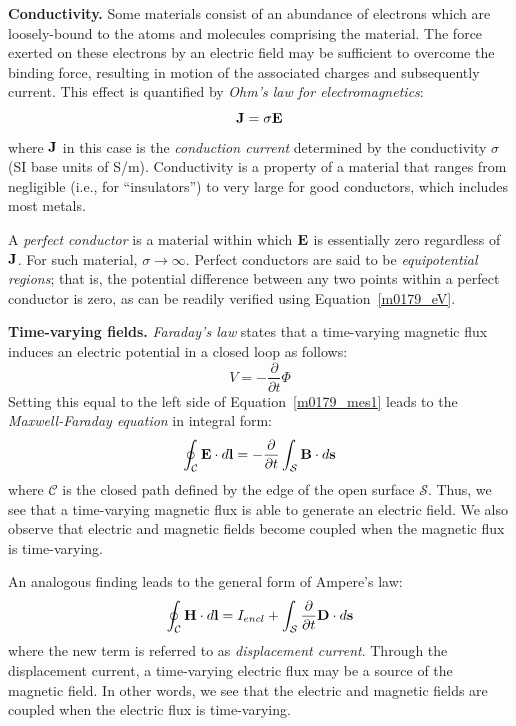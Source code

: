 {\bf Conductivity.}
Some materials consist of an abundance of electrons which are loosely-bound to the atoms and molecules comprising the material.
The force exerted on these electrons by an electric field may be sufficient to overcome the binding force, resulting in motion of the associated charges and subsequently current.
This effect is quantified by \emph{Ohm's law for electromagnetics}:
%
\begin{equation}
{\bf J} = \sigma{\bf E}
\label{m0179_eJE}
\end{equation}
%
where ${\bf J}$ in this case is the \emph{conduction current} determined by the conductivity $\sigma$ (SI base units of S/m).
Conductivity is a property of a material that ranges from negligible (i.e., for ``insulators'') to very large for good conductors, which includes most metals. 
  
A \emph{perfect conductor} 
is a material within which ${\bf E}$ is essentially zero regardless of ${\bf J}$.  
For such material, $\sigma\to\infty$.  
Perfect conductors are said to be \emph{equipotential regions}; that is, the potential difference between any two points within a perfect conductor is zero, as can be readily verified using Equation~\ref{m0179_eV}.

{\bf Time-varying fields.}
\emph{Faraday's law} 
states that a time-varying magnetic flux 
induces an electric potential in a closed loop as follows: 
%
\begin{equation}
V = -\frac{\partial}{\partial t}\Phi
\end{equation}
%
Setting this equal to the left side of Equation~\ref{m0179_mes1} leads to the \emph{Maxwell-Faraday equation} 
in integral form:
%
\begin{equation}
\oint_{\mathcal C}{{\bf E}\cdot d{\bf l}} = -\frac{\partial}{\partial t}\int_{\mathcal S}{\bf B}\cdot d{\bf s}
\end{equation}
%
where $\mathcal{C}$ is the closed path defined by the edge of the open surface $\mathcal{S}$.
Thus, we see that a time-varying magnetic flux is able to generate an electric field.
We also observe that electric and magnetic fields become coupled when the magnetic flux is time-varying.

An analogous finding leads to the general form of Ampere's law:
%
\begin{equation}
\oint_{\mathcal C}{{\bf H}\cdot d{\bf l}} = I_{encl} + \int_{\mathcal S}\frac{\partial}{\partial t}{\bf D}\cdot d{\bf s}
\end{equation}
%
where the new term is referred to as \emph{displacement current}.
Through the displacement current, a time-varying electric flux 
may be a source of the magnetic field.
In other words, we see that the electric and magnetic fields are coupled when the electric flux is time-varying.

